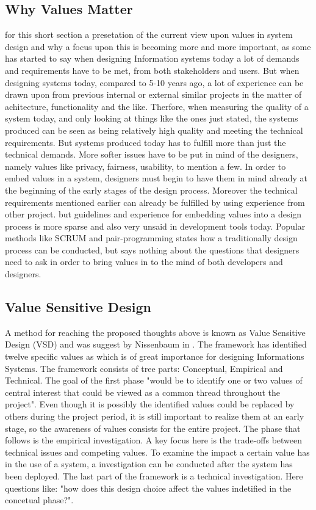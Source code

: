 \subsection{Why Values Matter}
for this short section a presetation of the current view upon values in system design and why a focus upon this is becoming more and more important, as some has started to say
when designing Information systems today a lot of demands and requirements have to be met, from both stakeholders and users. But when designing systems today, compared to 5-10 years ago, a lot of experience can be drawn upon from previous internal or external similar projects in the matter of achitecture, functionality and the like. Therfore, when measuring the quality of a system today, and only looking at things like the ones just stated, the systems produced can be seen as being relatively high quality and meeting the technical requirements. But systems produced today has to fulfill more than just the technical demands. More softer issues have to be put in mind of the designers, namely values like privacy, fairness, usability, to mention a few. In order to embed values in a system, designers must begin to have them in mind already at the beginning of the early stages of the design process. Moreover the technical requirements mentioned earlier can already be fulfilled by using experience from other project. but guidelines and experience for embedding values into a design process is more sparse and also very unsaid in development tools today. Popular methods like SCRUM and pair-programming states how a traditionally design process can be conducted, but says nothing about the questions that designers need to ask in order to bring values in to the mind of both developers and designers. 

\subsection{Value Sensitive Design}
A method for reaching the proposed thoughts above is known as Value Sensitive Design (VSD) and was suggest by Nissenbaum in . The framework has identified twelve specific values as which is of great importance for designing Informations Systems. The framework consists of tree parts: Conceptual, Empirical and Technical.
The goal of the first phase "would be to identify one or two values of central interest that could be viewed as a common thread throughout the project". Even though it is possibly the identified values could be replaced by others during the project period, it is still important to realize them at an early stage, so the awareness of values consists for the entire project. 
The phase that follows is the empirical investigation. A key focus here is the trade-offs between technical issues and competing values. To examine the impact a certain value has in the use of a system, a investigation can be conducted after the system has been deployed. 
The last  part of the framework is a technical investigation. Here questions like: "how does this design choice affect the values indetified in the concetual phase?". 

